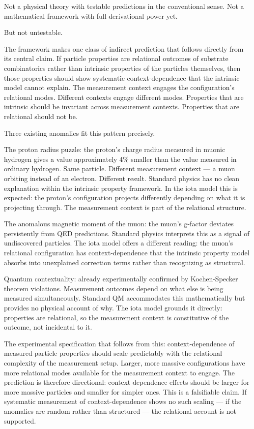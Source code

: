 \documentclass[11pt,letterpaper]{article}
\begin{document}
Not a physical theory with testable predictions in the conventional sense. Not a mathematical framework with full derivational power yet.

But not untestable.

The framework makes one class of indirect prediction that follows directly from its central claim. If particle properties are relational outcomes of substrate combinatorics rather than intrinsic properties of the particles themselves, then those properties should show systematic context-dependence that the intrinsic model cannot explain. The measurement context engages the configuration's relational modes. Different contexts engage different modes. Properties that are intrinsic should be invariant across measurement contexts. Properties that are relational should not be.

Three existing anomalies fit this pattern precisely.

The proton radius puzzle: the proton's charge radius measured in muonic hydrogen gives a value approximately 4\% smaller than the value measured in ordinary hydrogen. Same particle. Different measurement context --- a muon orbiting instead of an electron. Different result. Standard physics has no clean explanation within the intrinsic property framework. In the iota model this is expected: the proton's configuration projects differently depending on what it is projecting through. The measurement context is part of the relational structure.

The anomalous magnetic moment of the muon: the muon's g-factor deviates persistently from QED predictions. Standard physics interprets this as a signal of undiscovered particles. The iota model offers a different reading: the muon's relational configuration has context-dependence that the intrinsic property model absorbs into unexplained correction terms rather than recognizing as structural.

Quantum contextuality: already experimentally confirmed by Kochen-Specker theorem violations. Measurement outcomes depend on what else is being measured simultaneously. Standard QM accommodates this mathematically but provides no physical account of why. The iota model grounds it directly: properties are relational, so the measurement context is constitutive of the outcome, not incidental to it.

The experimental specification that follows from this: context-dependence of measured particle properties should scale predictably with the relational complexity of the measurement setup. Larger, more massive configurations have more relational modes available for the measurement context to engage. The prediction is therefore directional: context-dependence effects should be larger for more massive particles and smaller for simpler ones. This is a falsifiable claim. If systematic measurement of context-dependence shows no such scaling --- if the anomalies are random rather than structured --- the relational account is not supported.
\end{document}
